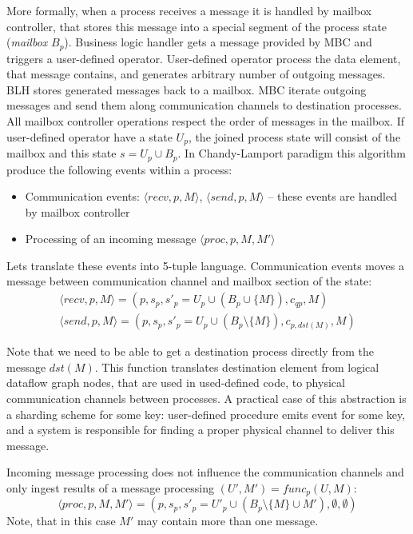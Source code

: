 More formally, when a process receives a message it is handled by mailbox controller, that stores this message into a special segment of the process state ({\em mailbox} $B_p$). Business logic handler gets a message provided by MBC and triggers a user-defined operator. User-defined operator process the data element, that message contains, and generates arbitrary number of outgoing messages. BLH stores generated messages back to a mailbox. MBC iterate outgoing messages and send them along communication channels to destination processes. All mailbox controller operations respect the order of messages in the mailbox. If user-defined operator have a state $U_p$, the joined process state will consist of the mailbox and this state $s=U_p \cup B_p$. In Chandy-Lamport paradigm this algorithm produce the following events within a process:
\begin{itemize}
    \item Communication events: $\langle recv, p, M\rangle$, $\langle send, p, M \rangle$ -- these events are handled by mailbox controller
    \item Processing of an incoming message $\langle proc, p, M, M' \rangle$
\end{itemize}

Lets translate these events into 5-tuple language. Communication events moves a message between communication channel and mailbox section of the state:
\begin{eqnarray}
\langle recv, p, M\rangle = (p, s_p, s'_p = U_p \cup \left(B_p \cup \{M\}\right), c_{qp}, M) \\
\langle send, p, M \rangle = (p, s_p, s'_p = U_p \cup \left(B_p\setminus\{M\}\right), c_{p, dst(M)}, M)
\end{eqnarray}

Note that we need to be able to get a destination process directly from the message $dst(M)$. This function translates destination element from logical dataflow graph nodes, that are used in used-defined code, to physical communication channels between processes. A practical case of this abstraction is a sharding scheme for some key: user-defined procedure emits event for some key, and a system is responsible for finding a proper physical channel to deliver this message.

Incoming message processing does not influence the communication channels and only ingest results of a message processing $(U', M') = func_p(U, M)$:
\begin{equation}
    \langle proc, p, M, M' \rangle = (p, s_p, s'_p = U'_p \cup \left(B_p \setminus \{M\} \cup M' \right) , \emptyset, \emptyset)
\end{equation}
Note, that in this case $M'$ may contain more than one message.

